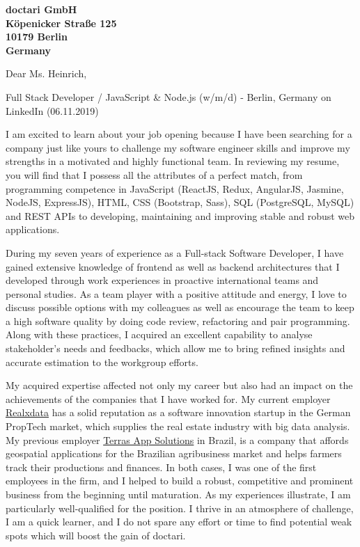 \documentclass[a4paper]{joaosoares-letter}
\begin{document}
\longindentation=0pt


\begin{letter}{\bfseries doctari GmbH\\Köpenicker Straße 125\\10179 Berlin\\Germany}


\date{Berlin, \today}


\opening{Dear Ms. Heinrich,}{Full Stack Developer / JavaScript \& Node.js (w/m/d) - Berlin, Germany on LinkedIn (06.11.2019)}

I am excited to learn about your job opening because I have been searching for a company just like yours to challenge my software engineer skills and improve my strengths in a motivated and highly functional team. In reviewing my resume, you will find that I possess all the attributes of a perfect match, from programming competence in JavaScript (ReactJS, Redux, AngularJS, Jasmine, NodeJS, ExpressJS), HTML, CSS (Bootstrap, Sass), SQL (PostgreSQL, MySQL) and REST APIs to developing, maintaining and improving stable and robust web applications.

During my seven years of experience as a Full-stack Software Developer, I have gained extensive knowledge of frontend as well as backend architectures that I developed through work experiences in proactive international teams and personal studies. As a team player with a positive attitude and energy, I love to discuss possible options with my colleagues as well as encourage the team to keep a high software quality by doing code review, refactoring and pair programming. Along with these practices, I acquired an excellent capability to analyse stakeholder's needs and feedbacks, which allow me to bring refined insights and accurate estimation to the workgroup efforts.

My acquired expertise affected not only my career but also had an impact on the achievements of the companies that I have worked for. My current employer \href{https://www.realxdata.com/}{Realxdata} has a solid reputation as a software innovation startup in the German PropTech market, which supplies the real estate industry with big data analysis. My previous employer \href{http://terras.agr.br/}{Terras App Solutions} in Brazil, is a company that affords geospatial applications for the Brazilian agribusiness market and helps farmers track their productions and finances. In both cases, I was one of the first employees in the firm, and I helped to build a robust, competitive and prominent business from the beginning until maturation. As my experiences illustrate, I am particularly well-qualified for the position. I thrive in an atmosphere of challenge, I am a quick learner, and I do not spare any effort or time to find potential weak spots which will boost the gain of doctari.


\end{letter}
\end{document}
